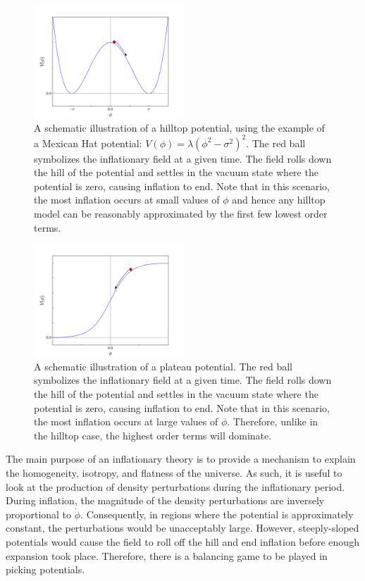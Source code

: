 \documentclass[onecolumn,apj]{emulateapj}
\begin{document}
\begin{figure}[h]
	\centering
	\includegraphics[width=0.50\textwidth]{figures/hilltop_cartoon.pdf}
	\caption{A schematic illustration of a hilltop potential, using the example of a Mexican Hat potential: $V(\phi)=\lambda(\phi^2-\sigma^2)^2$. The red ball symbolizes the inflationary field at a given time. The field rolls down the hill of the potential and settles in the vacuum state where the potential is zero, causing inflation to end. Note that in this scenario, the most inflation occurs at small values of $\phi$ and hence any hilltop model can be reasonably approximated by the first few lowest order terms.}
	\label{fig:MexHatCartoon}
\end{figure}

\begin{figure}[h]
	\centering
	\includegraphics[width=0.50\textwidth]{figures/plateau_cartoon.pdf}
	\caption{A schematic illustration of a plateau potential. The red ball symbolizes the inflationary field at a given time. The field rolls down the hill of the potential and settles in the vacuum state where the potential is zero, causing inflation to end. Note that in this scenario, the most inflation occurs at large values of $\phi$. Therefore, unlike in the hilltop case, the highest order terms will dominate.}
	\label{fig:PlateauCartoon}
\end{figure}

The main purpose of an inflationary theory is to provide a mechanism to explain the homogeneity, isotropy, and flatness of the universe. As such, it is useful to look at the production of density perturbations during the inflationary period. During inflation, the magnitude of the density perturbations are inversely proportional to $\dot \phi$. Consequently, in regions where the potential is approximately constant, the perturbations would be unacceptably large. However, steeply-sloped potentials would cause the field to roll off the hill and end inflation before enough expansion took place. Therefore, there is a balancing game to be played in picking potentials. 
\end{document}

